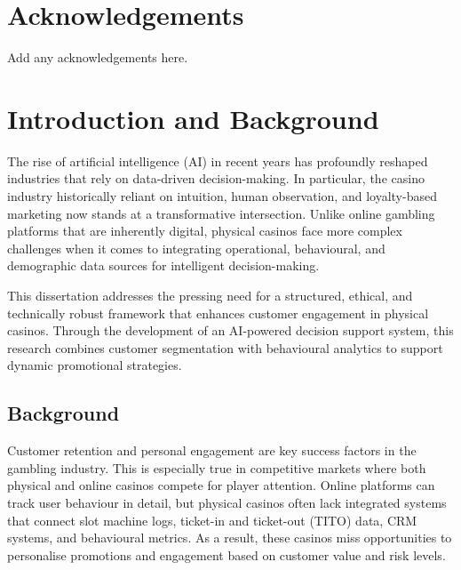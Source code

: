 \documentclass[12pt,a4paper]{report}
\begin{document}
\tableofcontents
\newpage

\listoffigures
\newpage

\listoftables
\newpage

\chapter*{Acknowledgements}

Add any acknowledgements here.

\newpage
\setcounter{page}{1}

\chapter{Introduction and Background}

The rise of artificial intelligence (AI) in recent years has profoundly reshaped industries that rely on data-driven decision-making. In particular, the casino industry historically reliant on intuition, human observation, and loyalty-based marketing now stands at a transformative intersection. Unlike online gambling platforms that are inherently digital, physical casinos face more complex challenges when it comes to integrating operational, behavioural, and demographic data sources for intelligent decision-making.

This dissertation addresses the pressing need for a structured, ethical, and technically robust framework that enhances customer engagement in physical casinos. Through the development of an AI-powered decision support system, this research combines customer segmentation with behavioural analytics to support dynamic promotional strategies.



\section{Background}

Customer retention and personal engagement are key success factors in the gambling industry. This is especially true in competitive markets where both physical and online casinos compete for player attention. Online platforms can track user behaviour in detail, but physical casinos often lack integrated systems that connect slot machine logs, ticket-in and ticket-out (TITO) data, CRM systems, and behavioural metrics. As a result, these casinos miss opportunities to personalise promotions and engagement based on customer value and risk levels.
\end{document}
